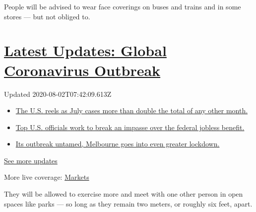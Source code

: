 People will be advised to wear face coverings on buses and trains and in
some stores --- but not obliged to.

\hypertarget{latest-updates-global-coronavirus-outbreak}{%
\section{\texorpdfstring{\href{https://www.nytimes.com/2020/08/01/world/coronavirus-covid-19.html?action=click\&pgtype=Article\&state=default\&region=MAIN_CONTENT_1\&context=storylines_live_updates}{Latest
Updates: Global Coronavirus
Outbreak}}{Latest Updates: Global Coronavirus Outbreak}}\label{latest-updates-global-coronavirus-outbreak}}

Updated 2020-08-02T07:42:09.613Z

\begin{itemize}
\tightlist
\item
  \href{https://www.nytimes.com/2020/08/01/world/coronavirus-covid-19.html?action=click\&pgtype=Article\&state=default\&region=MAIN_CONTENT_1\&context=storylines_live_updates\#link-34047410}{The
  U.S. reels as July cases more than double the total of any other
  month.}
\item
  \href{https://www.nytimes.com/2020/08/01/world/coronavirus-covid-19.html?action=click\&pgtype=Article\&state=default\&region=MAIN_CONTENT_1\&context=storylines_live_updates\#link-780ec966}{Top
  U.S. officials work to break an impasse over the federal jobless
  benefit.}
\item
  \href{https://www.nytimes.com/2020/08/01/world/coronavirus-covid-19.html?action=click\&pgtype=Article\&state=default\&region=MAIN_CONTENT_1\&context=storylines_live_updates\#link-2bc8948}{Its
  outbreak untamed, Melbourne goes into even greater lockdown.}
\end{itemize}

\href{https://www.nytimes.com/2020/08/01/world/coronavirus-covid-19.html?action=click\&pgtype=Article\&state=default\&region=MAIN_CONTENT_1\&context=storylines_live_updates}{See
more updates}

More live coverage:
\href{https://www.nytimes.com/live/2020/07/31/business/stock-market-today-coronavirus?action=click\&pgtype=Article\&state=default\&region=MAIN_CONTENT_1\&context=storylines_live_updates}{Markets}

They will be allowed to exercise more and meet with one other person in
open spaces like parks --- so long as they remain two meters, or roughly
six feet, apart.

